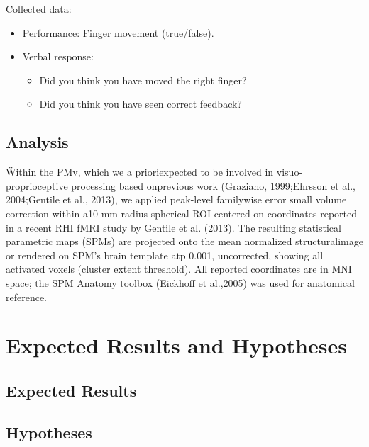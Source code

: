 \documentclass[man]{apa7}
\begin{document}
Collected data:
\begin{itemize}
    \item Performance: Finger movement (true/false).
    \item Verbal response:
    \begin{itemize}
        \item Did you think you have moved the right finger?
        \item Did you think you have seen correct feedback?
    \end{itemize}
\end{itemize} 

\subsection{Analysis}

\"Within the PMv, which we a prioriexpected to be involved in visuo-proprioceptive processing based onprevious work (Graziano, 1999;Ehrsson et al., 2004;Gentile et al., 2013), we applied peak-level familywise error small volume correction within a10 mm radius spherical ROI centered on coordinates reported in a recent RHI fMRI study by Gentile et al. (2013). The resulting statistical parametric maps (SPMs) are projected onto the mean normalized structuralimage or rendered on SPM’s brain template atp 0.001, uncorrected, showing all activated voxels (cluster extent threshold). All reported coordinates are in MNI space; the SPM Anatomy toolbox (Eickhoff et al.,2005) was used for anatomical reference.\"

\parencite{Limanowski2016}

\section{Expected Results and Hypotheses}

\subsection{Expected Results}

\subsection{Hypotheses}
\end{document}
